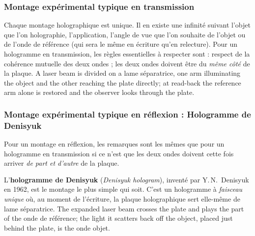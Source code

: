 \subsubsection{Montage expérimental typique en transmission}
Chaque montage holographique est unique. Il en existe une infinité suivant
l'objet que l'on holographie, l'application, l'angle de vue que l'on souhaite de
l'objet ou de l'onde de référence (qui sera le même en écriture qu'en
relecture). Pour un hologramme en transmission, les règles essentielles à
respecter sont : respect de la cohérence mutuelle des deux ondes ; les deux
ondes doivent être du \emph{même côté} de la plaque. A laser beam is divided on
a lame séparatrice, one arm illuminating the object and the other reaching the
plate directly; at read-back the reference arm alone is restored and the
observer looks through the plate.

\subsubsection{Montage expérimental typique en réflexion : Hologramme de Denisyuk}
Pour un montage en réflexion, les remarques sont les mêmes que pour un
hologramme en transmission si ce n'est que les deux ondes doivent cette fois
arriver \emph{de part et d'autre} de la plaque.

\begin{definition}
  L'\textbf{hologramme de Denisyuk} (\textit{Denisyuk hologram}), inventé par
  Y.\,N.\ Denisyuk en 1962, est le montage le plus simple qui soit. C'est un
  hologramme à \emph{faisceau unique} où, au moment de l'écriture, la plaque
  holographique sert elle-même de lame séparatrice. The expanded laser beam
  crosses the plate and plays the part of the onde de référence; the light it
  scatters back off the object, placed just behind the plate, is the onde objet.
\end{definition}

\begin{figure}[h!]
  \centering
\end{figure}

